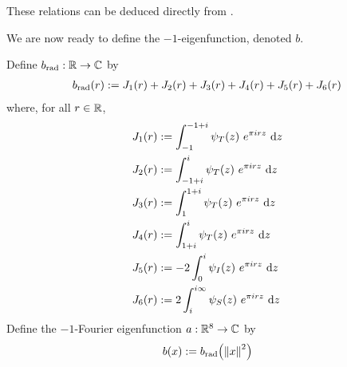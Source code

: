 These relations can be deduced directly from .

We are now ready to define the $-1$-eigenfunction, denoted $b$.

\begin{boxdefinition}\label{Ch4:Def:b}
    Define $b_{\operatorname{rad}} : \mathbb{R} \to \mathbb{C}$ by
    \begin{align}
        b_{\operatorname{rad}}\!\left( r \right) := J_1(r) + J_2(r) + J_3(r) + J_4(r) + J_5(r) + J_6(r)
        \label{Ch4:Eq:b_rad_def}
    \end{align}
    where, for all $r \in \mathbb{R}$,
    \begin{align}
        J_1(r) &:= \int_{-1}^{-1 + i} \psi_T\of{z} \,
                                 e^{\pi i r z} \,
                                 \diff{z}
            \label{Ch4:Eq:J_1_def} \\
        J_2(r) &:= \int_{-1 + i}^{i} \psi_T\of{z} \,
                                 e^{\pi i r z} \,
                                 \diff{z}
            \label{Ch4:Eq:J_2_def} \\
        J_3(r) &:= \int_{1}^{1 + i} \psi_T\of{z} \,
                                e^{\pi i r z} \,
                                \diff{z}
            \label{Ch4:Eq:J_3_def} \\
        J_4(r) &:= \int_{1 + i}^{i} \psi_T\of{z} \,
                                e^{\pi i r z} \,
                                \diff{z}
            \label{Ch4:Eq:J_4_def} \\
        J_5(r) &:= -2 \int_{0}^{i} \psi_I\of{z} \,
                                e^{\pi i r z} \,
                                \diff{z}
            \label{Ch4:Eq:J_5_def} \\
        J_6(r) &:= 2 \int_{i}^{i \infty} \psi_S\of{z} \,
                                e^{\pi i r z} \,
                                \diff{z}
            \label{Ch4:Eq:J_6_def}
    \end{align}
    Define the $-1$-Fourier eigenfunction $a : \mathbb{R}^8 \to \mathbb{C}$ by
    \begin{align}
        b(x) := b_{\operatorname{rad}}\!\left( \left\lVert x \right\rVert^2 \right)
            \label{Ch4:Eq:b_def}
    \end{align}
\end{boxdefinition}

